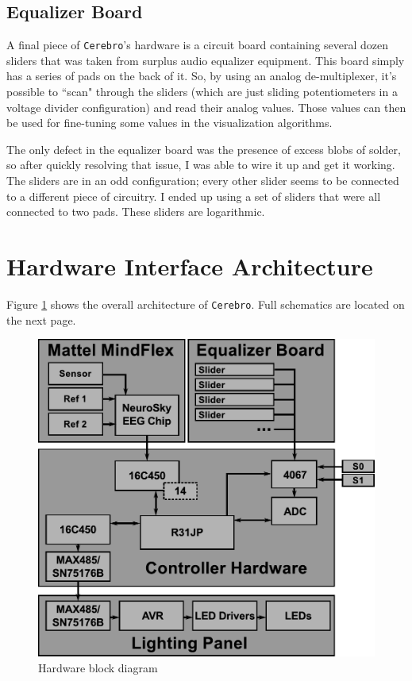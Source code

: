 \documentclass[letterpaper,10pt,notitlepage]{report}
\newcommand{\projname}{\texttt{Cerebro}}
\begin{document}
    \subsection{Equalizer Board}

        A final piece of \projname's hardware is a circuit board containing
        several dozen sliders that was taken from surplus audio equalizer
        equipment.  This board simply has a series of pads on the back of it.
        So, by using an analog de-multiplexer, it's possible to ``scan" through
        the sliders (which are just sliding potentiometers in a voltage divider
        configuration) and read their analog values.  Those values can then be
        used for fine-tuning some values in the visualization algorithms.

        The only defect in the equalizer board was the presence of excess blobs
        of solder, so after quickly resolving that issue, I was able to wire it
        up and get it working.  The sliders are in an odd configuration; every
        other slider seems to be connected to a different piece of circuitry.
        I ended up using a set of sliders that were all connected to two pads.
        These sliders are logarithmic.

        \pagebreak

\section{Hardware Interface Architecture}

    Figure \ref{fig:hwarch} shows the overall architecture of \projname{}.
    Full schematics are located on the next page.

    \begin{figure}[h!]
    \begin{center}
        \includegraphics[scale=.5]{fig/blockdiagram.pdf}
        \caption{Hardware block diagram}
        \label{fig:hwarch}
    \end{center}
    \end{figure}
\end{document}
